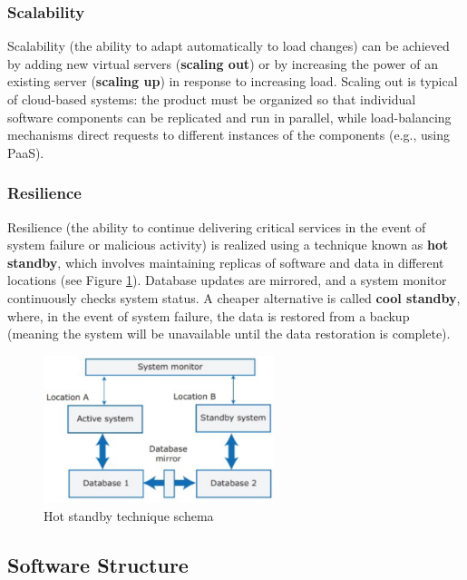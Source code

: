 \subsubsection{Scalability}

Scalability (the ability to adapt automatically to load changes) can be achieved by adding new virtual servers (\textbf{scaling out}) or by increasing the power of an existing server (\textbf{scaling up}) in response to increasing load. Scaling out is typical of cloud-based systems: the product must be organized so that individual software components can be replicated and run in parallel, while load-balancing mechanisms direct requests to different instances of the components (e.g., using PaaS).

\subsubsection{Resilience}

Resilience (the ability to continue delivering critical services in the event of system failure or malicious activity) is realized using a technique known as \textbf{hot standby}, which involves maintaining replicas of software and data in different locations (see Figure \ref{fig:hot-standby}). Database updates are mirrored, and a system monitor continuously checks system status. A cheaper alternative is called \textbf{cool standby}, where, in the event of system failure, the data is restored from a backup (meaning the system will be unavailable until the data restoration is complete).

\begin{figure}[H]
    \centering
    \includegraphics[width=0.6\textwidth]{images/Cloud/hot-standby.png}
    \caption{Hot standby technique schema}
    \label{fig:hot-standby}
\end{figure}

\subsection{Software Structure}

